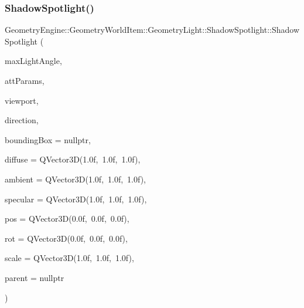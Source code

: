 \subsubsection{\texorpdfstring{ShadowSpotlight()}{ShadowSpotlight()}\hspace{0.1cm}{\footnotesize\ttfamily [1/2]}}
{\footnotesize\ttfamily Geometry\+Engine\+::\+Geometry\+World\+Item\+::\+Geometry\+Light\+::\+Shadow\+Spotlight\+::\+Shadow\+Spotlight (\begin{DoxyParamCaption}\item[{float}]{max\+Light\+Angle,  }\item[{const Q\+Vector3D \&}]{att\+Params,  }\item[{const \mbox{\hyperlink{class_geometry_engine_1_1_geometry_item_utils_1_1_viewport}{Geometry\+Item\+Utils\+::\+Viewport}} \&}]{viewport,  }\item[{const Q\+Vector3D \&}]{direction,  }\item[{\mbox{\hyperlink{class_geometry_engine_1_1_geometry_world_item_1_1_geometry_item_1_1_geometry_item}{Geometry\+Item\+::\+Geometry\+Item}} $\ast$}]{bounding\+Box = {\ttfamily nullptr},  }\item[{const Q\+Vector3D \&}]{diffuse = {\ttfamily QVector3D(1.0f,~1.0f,~1.0f)},  }\item[{const Q\+Vector3D \&}]{ambient = {\ttfamily QVector3D(1.0f,~1.0f,~1.0f)},  }\item[{const Q\+Vector3D \&}]{specular = {\ttfamily QVector3D(1.0f,~1.0f,~1.0f)},  }\item[{const Q\+Vector3D \&}]{pos = {\ttfamily QVector3D(0.0f,~0.0f,~0.0f)},  }\item[{const Q\+Vector3D \&}]{rot = {\ttfamily QVector3D(0.0f,~0.0f,~0.0f)},  }\item[{const Q\+Vector3D \&}]{scale = {\ttfamily QVector3D(1.0f,~1.0f,~1.0f)},  }\item[{\mbox{\hyperlink{class_geometry_engine_1_1_geometry_world_item_1_1_world_item}{World\+Item}} $\ast$}]{parent = {\ttfamily nullptr} }\end{DoxyParamCaption})}

